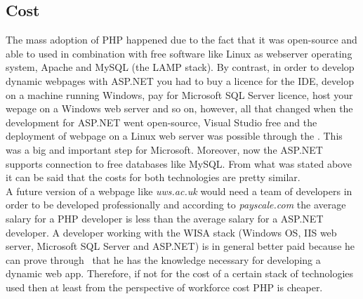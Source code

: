 \documentclass[11]{article}
\begin{document}

	

	\subsection{Cost}
	The mass adoption of PHP happened due to the fact that it was open-source and able to used in combination with free software like Linux as webserver operating system, Apache and MySQL (the LAMP stack). By contrast, in order to develop dynamic webpages with ASP.NET you had to buy a licence for the IDE, develop on a machine running Windows, pay for Microsoft SQL Server licence, host your wepage on a Windows web server and so on, however, all that changed when the development for ASP.NET went open-source, Visual Studio free and the deployment of webpage on a Linux web server was possible through the \cite{Mono}. This was a big and important step for Microsoft. Moreover, now the ASP.NET supports connection to free databases like MySQL. From what was stated above it can be said that the costs for both technologies are pretty similar.\\
	\indent
	A future version of a webpage like \textit{uws.ac.uk} would need a team of developers in order to be developed professionally and according to \textit{payscale.com} the average salary for a PHP developer is less than the average salary for a ASP.NET developer. A developer working with the WISA stack (Windows OS, IIS web server, Microsoft SQL Server and ASP.NET) is in general better paid because he can prove through~\cite{MScert} that he has the knowledge necessary for developing a dynamic web app. Therefore, if not for the cost of a certain stack of technologies used then at least from the perspective of workforce cost PHP is cheaper.
\end{document}
